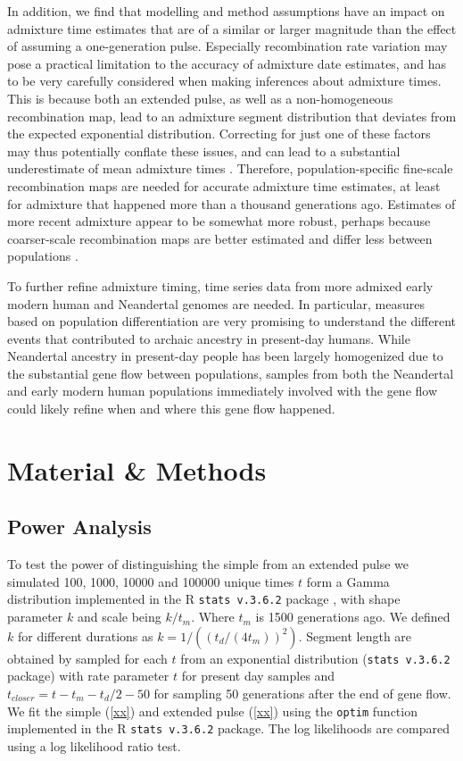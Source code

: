 \documentclass[11pt]{article}
\begin{document}
In addition, we find that modelling and method assumptions have an impact on admixture time estimates that are of a similar or larger magnitude than the effect of assuming a one-generation pulse. Especially recombination rate variation may pose a practical limitation to the accuracy of admixture date estimates, and has to be very carefully considered when making inferences about admixture times. This is because both an extended pulse, as well as a non-homogeneous recombination map, lead to an admixture segment distribution that deviates from the expected exponential distribution. Correcting for just one of these factors may thus potentially conflate these issues, and can lead to a substantial underestimate of mean admixture times \citep{sankararaman_date_2012}. Therefore, population-specific fine-scale recombination maps are needed for accurate admixture time estimates, at least for admixture that happened more than a thousand generations ago. Estimates of more recent admixture appear to be somewhat more robust, perhaps because coarser-scale recombination maps are better estimated and differ less between populations \citep{hinch_landscape_2011}. 


To further refine admixture timing, time series data from more admixed early modern human and Neandertal genomes are  needed. In particular, measures based on population differentiation  \citep[e.g][]{wall_higher_2013,browning_analysis_2018,villanea_multiple_2019} are very promising to understand the different events that contributed to archaic ancestry in present-day humans. While Neandertal ancestry in present-day people has been largely homogenized due to the substantial gene flow between populations, samples from both the Neandertal and early modern human populations immediately involved with the gene flow could likely refine when and where this gene flow happened. 


\section{Material \& Methods}\label{methods}

\subsection{Power Analysis}\label{power analysis}

To test the power of distinguishing the simple from an extended pulse we simulated 100, 1000, 10000 and 100000 unique times $t$ form a Gamma distribution implemented in the R \texttt{stats v.3.6.2} package \citep{R_Core_Team_2019}, with shape parameter $k$ and scale being $k/t_m$. Where $t_m$ is 1500 generations ago. We defined $k$ for different durations as $k=1/((t_d/(4t_m))^2)$. Segment length are obtained by sampled for each $t$ from an exponential distribution (\texttt{stats v.3.6.2} package) with rate parameter $t$ for present day samples and $t_{closer}= t - t_m - t_d/2 -50$ for sampling 50 generations after the end of gene flow.
We fit the simple (\ref{xx}) and extended pulse (\ref{xx}) using the \texttt{optim} function implemented in the R \texttt{stats v.3.6.2} package. The log likelihoods are compared using a log likelihood ratio test.
\end{document}
